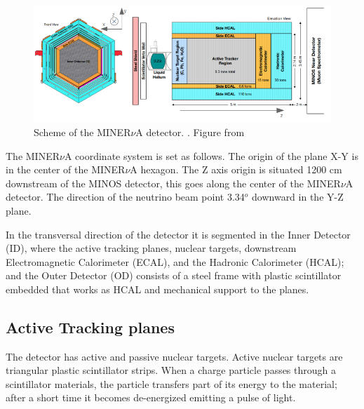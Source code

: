 \begin{figure}[!htb]
\centering
\includegraphics[scale=0.5]{Figures/Chapter2/DetectorScheme.png}

        \caption{Scheme of the MINER$\nu$A detector. . Figure from \cite{MINERvA}} 
\label{fig:MnvExp:MnvDetector:Scheme}
\end{figure}

The MINER$\nu$A coordinate system is set as follows. The origin of the plane X-Y is in the center of the MINER$\nu$A hexagon. The Z axis origin is situated 1200 cm downstream of the MINOS detector, this goes along the center of the MINER$\nu$A detector. The direction of the neutrino beam point 3.34$^o$ downward in the Y-Z plane. 

In the transversal direction of the detector it is segmented in the Inner Detector (ID), where the active tracking planes, nuclear targets, downstream Electromagnetic Calorimeter (ECAL), and the Hadronic Calorimeter (HCAL); and the Outer Detector (OD) consists of a steel frame with plastic scintillator embedded that works as HCAL and mechanical support to the planes.   

\subsection{Active Tracking planes}
\label{Cap:MnvExp:MnvDetector:ActiveTrackingPlanes}

The detector has active and passive nuclear targets. Active nuclear targets are triangular plastic scintillator strips. When a charge particle passes through a scintillator materials, the particle transfers part of its energy to the material; after a short time it becomes de-energized emitting a pulse of light\cite{DetectionTechniques}. 

